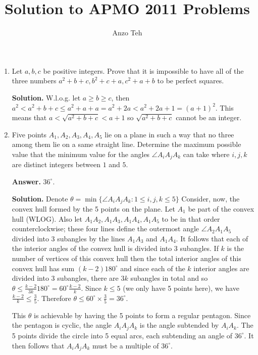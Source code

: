 \documentclass[11pt,a4paper]{article}
\begin{document}
\newcommand{\la}{\leftarrow}
\newcommand{\lra}{\leftrightarrow}
\newcommand{\bbN}{\mathbb{N}}
\newcommand{\bbZ}{\mathbb{Z}}
\newcommand{\dsum}{\displaystyle\sum}
\newcommand{\dprod}{\displaystyle\prod}


\title{Solution to APMO 2011 Problems}
\author{Anzo Teh}
\date{}
\maketitle

\begin{enumerate}
	\item Let $a,b,c$ be positive integers. Prove that it is impossible to have all of the three numbers $a^2+b+c,b^2+c+a,c^2+a+b$ to be perfect squares.
	
	\textbf{Solution.} W.l.o.g. let $a\ge b\ge c$, then $a^2< a^2+b+c\le a^2+a+a=a^2+2a<a^2+2a+1=(a+1)^2$. This means that $a < \sqrt{a^2+b+c} < a+1$ so $\sqrt{a^2+b+c}$ cannot be an integer. 
	
	\item Five points $A_1,A_2,A_3,A_4,A_5$ lie on a plane in such a way that no three among them lie on a same straight line. Determine the maximum possible value that the minimum value for the angles $\angle A_iA_jA_k$ can take where $i, j, k$ are distinct integers between $1$ and $5$.
	
	\textbf{Answer.} $36^{\circ}$. 
	
	\textbf{Solution.} 
	Denote $\theta = \min\{\angle A_iA_jA_k: 1\le i, j, k\le 5\}$
	Consider, now, the convex hull formed by the 5 points on the plane. Let $A_1$ be part of the convex hull (WLOG). Also let $A_1A_2, A_1A_3, A_1A_4, A_1A_5$ to be in that order counterclockwise; these four lines define the outermost angle $\angle A_2A_1A_5$ divided into 3 subangles by the lines $A_1A_3$ and $A_1A_4$. It follows that each of the interior angles of the convex hull is divided into 3 subangles. If $k$ is the number of vertices of this convex hull then the total interior angles of this convex hull has sum $(k-2)180^{\circ}$ and since each of the $k$ interior angles are divided into 3 subangles, there are $3k$ subangles in total and so $\theta\le \frac{k-2}{3k}180^{\circ}=60^{\circ}\frac{k-2}{k}$. 
	Since $k\le 5$ (we only have 5 points here), 
	we have $\frac{k-2}{k}\le \frac{3}{5}$. Therefore $\theta\le 60^{\circ}\times\frac{3}{5}=36^{\circ}$. 
	
	This $\theta$ is achievable by having the 5 points to form a regular pentagon. Since the pentagon is cyclic, the angle $A_iA_jA_k$ is the angle subtended by $A_iA_k$. The 5 points divide the circle into 5 equal arcs, each subtending an angle of $36^{\circ}$. It then follows that $A_iA_jA_k$ must be a multiple of $36^{\circ}$. 
	

\end{enumerate}
\end{document}
